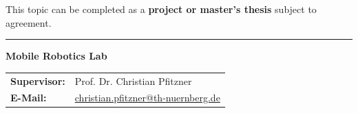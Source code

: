 \documentclass{ohm_project_description}
\begin{document}
\vspace{0.5cm}
This topic can be completed as a \textbf{project or master's thesis} subject to agreement.

\vfill
\textcolor{ohm_red}{\rule{\linewidth}{0.4mm}}
\textbf{\textcolor{ohm_red}{Mobile Robotics Lab}} \\
\begin{tabular}{@{}ll}
\textbf{Supervisor:} & Prof. Dr. Christian Pfitzner \\
\textbf{E-Mail:}     & \href{mailto:christian.pfitzner@th-nuernberg.de}{christian.pfitzner@th-nuernberg.de} \\
\end{tabular}
\end{document}
